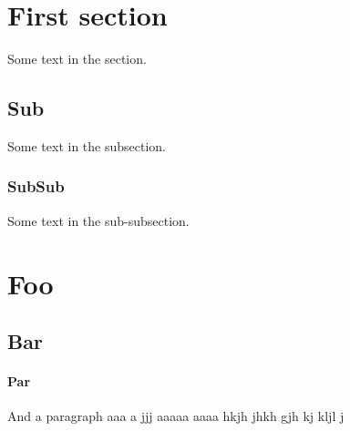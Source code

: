\documentclass{article}
\begin{document}
\section {First section}

Some text in the section.  
 
\subsection {Sub}
  
Some text in the subsection.

\subsubsection {SubSub} 

Some text in the sub-subsection. 


\section{Foo}

\subsection {Bar}

\paragraph {Par}

And a paragraph aaa a jjj aaaaa
aaaa hkjh jhkh gjh  kj kljl j
\end{document}
